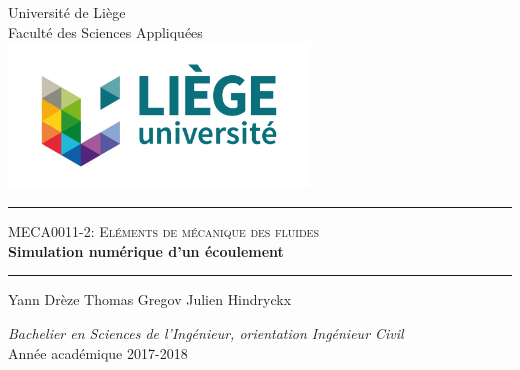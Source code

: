 \documentclass[a4paper,12pt]{article}
\begin{document}
\renewcommand{\contentsname}{Table des matières}
\renewcommand{\listfigurename}{Liste des figures}
\renewcommand{\listtablename}{Liste des tableaux}

\renewcommand{\thesection}{\arabic{section}.}
\renewcommand{\thesubsection}{\arabic{section}.\arabic{subsection}.}
\renewcommand{\thesubsubsection}{\arabic{section}.\arabic{subsection}.\arabic{subsubsection}.}


\thispagestyle{empty}
\begin{center}
	\Large Université de Liège\\
	Faculté des Sciences Appliquées \\
	\vspace{0.5cm}
	\includegraphics[width=8cm]{ulg.jpg}
\end{center}
\vspace*{3cm}
 \begin{center}
	\noindent\rule[0.5ex]{\textwidth}{1pt}
	\textsc{\large MECA0011-2: Eléments de mécanique des fluides}\\
	\vspace*{0.1cm}
	\bfseries \Huge Simulation numérique d'un écoulement
 	\vspace*{-0.6cm}
	\noindent\rule[0.5ex]{\textwidth}{1pt}
\end{center}
\centerline{\large Yann {\sc Drèze}   \quad Thomas {\sc Gregov} \quad Julien {\sc Hindryckx}}
\vfill
\begin{center}
	\large\textsl{Bachelier en Sciences de l'Ingénieur, orientation Ingénieur Civil }\\
	\vspace*{0.5cm}
	Année académique 2017-2018
\end{center}
\pagebreak
\newpage
{}
\fancyhead[R]{}

\doparttoc
\tableofcontents

\newpage
\fancyhead[R]{}
\listoffigures
\listoftables
\newpage
\renewcommand{\sectionmark}[1]{\markboth{#1}{}}
\end{document}
